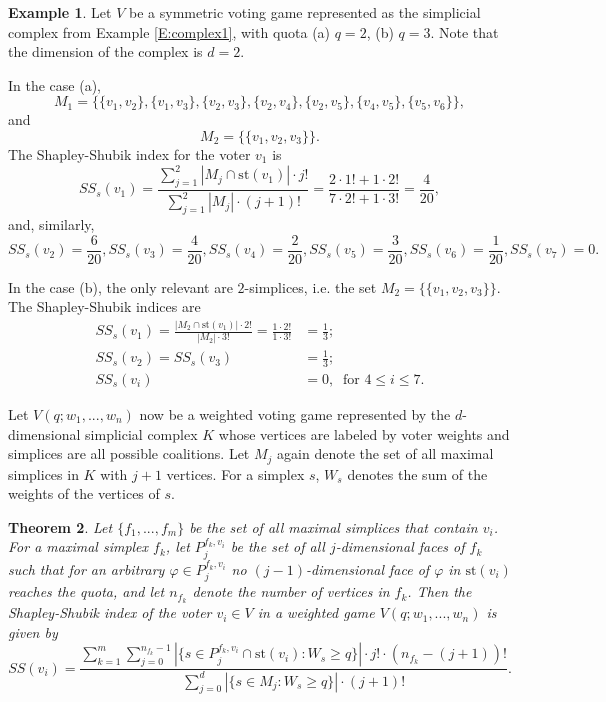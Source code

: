 \documentclass[11pt]{amsart}
\theoremstyle{plain}
\newtheorem{thm}{Theorem}[section]
\theoremstyle{definition}
\newtheorem{example}[thm]{Example}
\theoremstyle{remark}
\begin{document}
\begin{example}
Let $V$ be a symmetric voting game represented as the simplicial complex from Example \ref{E:complex1}, with quota (a) $q=2$, (b) $q=3$. Note that the dimension of the complex is $d=2$.

In the case (a), $$M_1=\{\{v_1, v_2\}, \{v_1, v_3\}, \{v_2, v_3\}, \{v_2, v_4\}, \{v_2, v_5\}, \{v_4, v_5\}, \{v_5, v_6\}\},$$ and $$M_2=\{\{v_1,v_2,v_3\}\}.$$
The Shapley-Shubik index for the voter $v_1$ is
$$SS_s (v_1)=\frac{\sum_{j=1}^2 |M_j \cap \text{st}(v_1)|\cdot j!}{\sum_{j=1}^2 |M_j|\cdot (j+1)!}=\frac{2\cdot 1! + 1\cdot 2!}{7\cdot 2!+1\cdot 3!}=\frac{4}{20},$$
and, similarly,
$$SS_s (v_2)=\frac{6}{20}, SS_s (v_3)=\frac{4}{20}, SS_s (v_4)=\frac{2}{20}, SS_s (v_5)=\frac{3}{20}, SS_s (v_6)=\frac{1}{20}, SS_s (v_7)=0.$$

In the case (b), the only relevant are $2$-simplices, i.e. the set $M_2=\{\{v_1,v_2,v_3\}\}$. The Shapley-Shubik indices are
\begin{align*}
SS_s (v_1)=\frac{|M_2 \cap \text{st}(v_1)|\cdot 2!}{|M_2|\cdot 3!}=\frac{1\cdot 2!}{1\cdot 3!} & =\frac{1}{3};\\
SS_s (v_2)=SS_s (v_3) & =\frac{1}{3}; \\
 SS_s (v_i) & =0,\  \text{ for } 4\leq i \leq 7.
\end{align*}
\end{example}

Let $V(q;w_1,...,w_n)$ now be a weighted voting game represented by the $d$-dimensional simplicial complex $K$ whose vertices are labeled by voter weights and simplices are all possible coalitions. Let $M_j$ again  denote the set of all maximal simplices in $K$ with $j+1$ vertices. For a simplex $s$, $W_s$ denotes the sum of the weights of the vertices of $s$. 
\begin{thm}
Let $\{f_1,...,f_m\}$ be the set of all maximal simplices that contain $v_i$. For a maximal simplex $f_k$, let $P_{j}^{f_k, v_i}$ be the set of all $j$-dimensional faces of $f_k$ such that for an arbitrary $\varphi \in P_{j}^{f_k, v_i}$ no $(j-1)$-dimensional face of $\varphi$ in $\text{st}(v_i)$ reaches the quota, and let $n_{f_k}$ denote the number of vertices in $f_k$. Then the Shapley-Shubik index of the voter $v_i \in V$ in a weighted game $V(q;w_1,...,w_n)$ is given by
$$SS(v_i)=\frac{\sum_{k=1}^{m} \sum_{j=0}^{n_{f_k}-1} |\{s\in P_{j}^{f_k, v_i} \cap \text{st}(v_i): W_s \geq q\}|\cdot j! \cdot (n_{f_k}-(j+1))!}{\sum_{j=0}^d |\{s\in M_j: W_s \geq q\}|\cdot (j+1)!}.$$
\end{thm}
\end{document}
